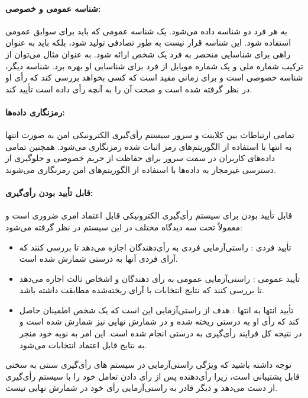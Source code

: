 \documentclass[12pt]{article}
\begin{document}
\paragraph{شناسه عمومی و خصوصی:}
به هر فرد دو شناسه داده می‌شود. یک شناسه عمومی که باید برای سوابق عمومی استفاده شود. این شناسه قرار نیست به طور تصادفی تولید شود، بلکه باید به عنوان راهی برای شناسایی منحصر به فرد یک شخص ارائه شود. به عنوان مثال می‌توان از ترکیب شماره ملی و یک شماره موبایل از فرد برای شناسایی او بهره برد. شناسه دیگر، شناسه خصوصی است و برای زمانی مفید است که کسی بخواهد بررسی کند که رأی او در نظر گرفته شده است و صحت آن را به آنچه رأی داده است تأیید کند. 

\paragraph{رمزنگاری داده‌ها:}
تمامی ارتباطات بین کلاینت و سرور سیستم رأی‌گیری الکترونیکی امن به صورت انتها به انتها%
با استفاده از الگوریتم‌های رمز اثبات شده رمزنگاری می‌شود. همچنین تمامی داده‌های کاربران در سمت سرور برای حفاظت از حریم خصوصی و جلوگیری از دسترسی غیرمجاز به داده‌ها با استفاده از الگوریتم‌های امن رمزنگاری می‌شوند. 

\paragraph{قابل تأیید بودن رأی‌گیری:}
قابل تأیید بودن%
برای سیستم رأی‌گیری الکترونیکی قابل اعتماد امری ضروری است و معمولاً تحت سه دیدگاه مختلف در این سیستم در نظر گرفته می‌شود:
\begin{itemize}
\item
تأیید فردی%
: 
راستی‌آزمایی فردی به رأی‌دهندگان اجازه می‌دهد تا بررسی کنند که آرای فردی آنها به درستی شمارش شده است. 
\item
تأیید عمومی%
:  راستی‌آزمایی عمومی به رأی دهندگان و اشخاص ثالث اجازه می‌دهد تا بررسی کنند که نتایج انتخابات با آرای ریخته‌شده مطابقت داشته باشد.
\item
تأیید انتها به انتها%
: 
هدف از راستی‌آزمایی 
این است که یک شخص اطمینان حاصل کند که رأی او به درستی ریخته شده و در شمارش نهایی نیز شمارش شده است و در نتیجه کل فرایند رأی‌گیری به درستی انجام شده است. این امر به نوبه خود منجر به نتایج قابل اعتماد انتخابات می‌شود.
\end{itemize}
توجه داشته باشید که ویژگی راستی‌آزمایی 
در سیستم های رأی‌گیری سنتی به سختی قابل پشتیبانی است، زیرا رأی‌دهنده پس از رأی دادن تعامل خود را با سیستم رأی‌گیری از دست می‌دهد و دیگر قادر به راستی‌آزمایی رأی خود در شمارش نهایی نیست. 
\end{document}
